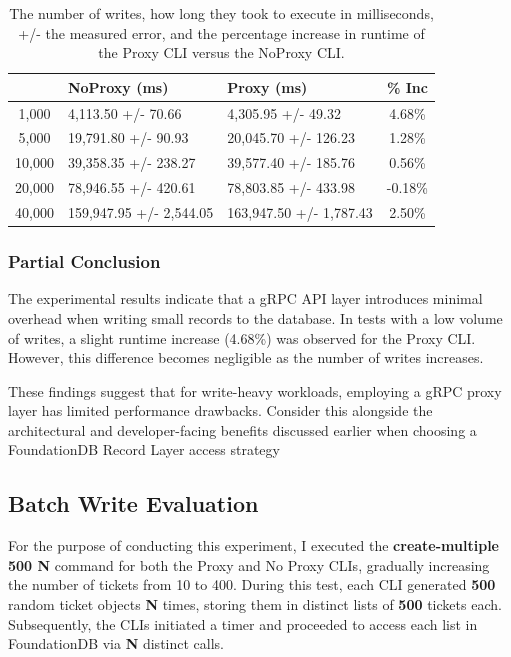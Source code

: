 \documentclass[sigconf]{acmart}
\begin{document}
\begin{table}[h]
\begin{tabular}{|c|l|l|c|}
    \hline
    \rowcolor[HTML]{656565} 
    \multicolumn{1}{|c}{\cellcolor[HTML]{656565}{\color[HTML]{FFFFFF} \textbf{N}}} &
    {\color[HTML]{FFFFFF} \textbf{NoProxy (ms)}} &
    {\color[HTML]{FFFFFF} \textbf{Proxy (ms)}} &
    {\color[HTML]{FFFFFF} \textbf{\% Inc}} \\ \hline
    1,000  & 4,113.50 +/- 70.66      & 4,305.95 +/- 49.32      & 4.68\%  \\
    \rowcolor[HTML]{EFEFEF} 
    5,000  & 19,791.80 +/- 90.93     & 20,045.70 +/- 126.23    & 1.28\%  \\
    10,000 & 39,358.35 +/- 238.27    & 39,577.40 +/- 185.76    & 0.56\%  \\
    \rowcolor[HTML]{EFEFEF} 
    20,000 & 78,946.55 +/- 420.61    & 78,803.85 +/- 433.98    & -0.18\% \\
    40,000 & 159,947.95 +/- 2,544.05 & 163,947.50 +/- 1,787.43 & 2.50\%  \\ \hline
\end{tabular}
\caption{The number of writes, how long they took to execute in milliseconds, +/- the measured error, and the percentage increase in runtime of the Proxy CLI versus the NoProxy CLI.}
\end{table}

\subsubsection{Partial Conclusion}

The experimental results indicate that a gRPC API layer introduces minimal overhead when writing small records to the database. In tests with a low volume of writes, a slight runtime increase (4.68\%) was observed for the Proxy CLI. However, this difference becomes negligible as the number of writes increases.

These findings suggest that for write-heavy workloads, employing a gRPC proxy layer has limited performance drawbacks. Consider this alongside the architectural and developer-facing benefits discussed earlier when choosing a FoundationDB Record Layer access strategy

\subsection{Batch Write Evaluation}

For the purpose of conducting this experiment, I executed the \textbf{create-multiple 500 N} command for both the Proxy and No Proxy CLIs, gradually increasing the number of tickets from 10 to 400. During this test, each CLI generated \textbf{500} random ticket objects \textbf{N} times, storing them in distinct lists of \textbf{500} tickets each. Subsequently, the CLIs initiated a timer and proceeded to access each list in FoundationDB via \textbf{N} distinct calls.
\end{document}
